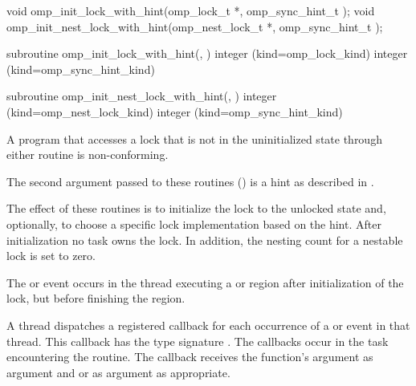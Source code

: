 \format
\begin{ccppspecific}
\begin{boxedcode}
void omp\_init\_lock\_with\_hint(omp\_lock\_t *, 
                             omp\_sync\_hint\_t );
void omp\_init\_nest\_lock\_with\_hint(omp\_nest\_lock\_t *, 
                                  omp\_sync\_hint\_t );
\end{boxedcode}
\end{ccppspecific}

\begin{fortranspecific}
\begin{boxedcode}
subroutine omp\_init\_lock\_with\_hint(, )
integer (kind=omp\_lock\_kind) 
integer (kind=omp\_sync\_hint\_kind) 

subroutine omp\_init\_nest\_lock\_with\_hint(, )
integer (kind=omp\_nest\_lock\_kind) 
integer (kind=omp\_sync\_hint\_kind) 
\end{boxedcode}
\end{fortranspecific}

\constraints
A program that accesses a lock that is not in the uninitialized state through either routine 
is non-conforming.

The second argument passed to these routines () is a hint 
as described in .

\effect
The effect of these routines is to initialize the lock to the unlocked state and, optionally, to choose a specific lock implementation based on the hint. 
After initialization no task owns the lock. In addition, the nesting count for a nestable lock is set to zero.

\events

The  or  event occurs in the thread 
executing a  or  region
after initialization of the lock, but before finishing the region.

\tools

A thread dispatches a registered 
callback for each occurrence of a  or  event 
in that thread.  This callback has the type signature .
The callbacks occur in the task encountering the routine. 
The callback receives the function's  argument as
 argument and
 or 
  as  argument as appropriate.

